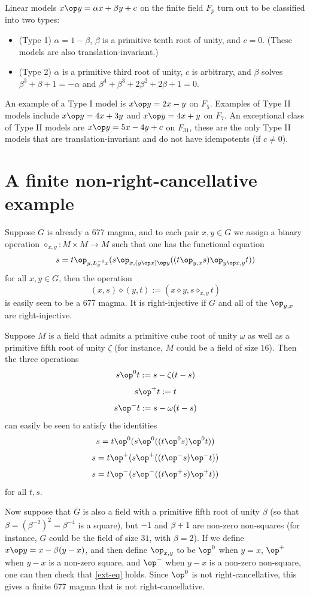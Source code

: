 Linear models $x \op y = \alpha x + \beta y + c$ on the finite field $F_p$ turn out to be classified into two types:
\begin{itemize}
\item (Type 1) $\alpha=1-\beta$, $\beta$ is a primitive tenth root of unity, and $c=0$.  (These models are also translation-invariant.)
\item (Type 2) $\alpha$ is a primitive third root of unity, $c$ is arbitrary, and $\beta$ solves $\beta^3+\beta+1=-\alpha$ and $\beta^4+\beta^3+2\beta^2+2\beta+1=0$.
\end{itemize}
An example of a Type I model is $x \op y = 2x-y$ on $F_5$.  Examples of Type II models include $x \op y = 4x+3y$ and $x \op y = 4x+y$ on $F_7$.  An exceptional class of Type II models are $x \op y = 5x-4y+c$ on $F_{31}$, these are the only Type II models that are translation-invariant and do not have idempotents (if $c \neq 0$).

\section{A finite non-right-cancellative example}

Suppose $G$ is already a 677 magma, and to each pair $x,y \in G$ we assign a binary operation $\diamond_{x,y}: M \times M \to M$ such that one has the functional equation
\begin{equation}\label{ext-eq}
  s = t \op_{y,L_y^{-1} x} (s \op_{x, (y \op x) \op y} ((t \op_{y,x} s) \op_{y \op x, y} t))
\end{equation}
for all $x,y \in G$, then the operation
$$ (x,s) \diamond (y,t) := (x \diamond y, s \diamond_{x,y} t)$$
is easily seen to be a 677 magma.  It is right-injective if $G$ and all of the $\op_{y,x}$ are right-injective.

Suppose $M$ is a field that admits a primitive cube root of unity $\omega$ as well as a primitive fifth root of unity $\zeta$ (for instance, $M$ could be a field of size $16$).  Then the three operations
$$ s \op^0 t := s - \zeta(t-s)$$
$$ s \op^+ t := t$$
$$ s \op^- t := s - \omega(t-s)$$
can easily be seen to satisfy the identities
$$s = t \op^0 (s \op^0 ((t \op^0 s) \op^0 t))$$
$$s = t \op^+ (s \op^+ ((t \op^- s) \op^- t))$$
$$s = t \op^- (s \op^- ((t \op^+ s) \op^+ t))$$
for all $t,s$.

Now suppose that $G$ is also a field with a primitive fifth root of unity $\beta$ (so that $\beta = \left(\beta^{-2}\right)^2 = \beta^{-4}$ is a square), but $-1$ and $\beta+1$ are non-zero non-squares (for instance, $G$ could be the field of size $31$, with $\beta=2$).  If we define $x \op y = x - \beta(y-x)$, and then define $\op_{x,y}$ to be $\op^0$ when $y=x$, $\op^+$ when $y-x$ is a non-zero square, and $\op^-$ when $y-x$ is a non-zero non-square, one can then check that \eqref{ext-eq} holds. Since $\op^0$ is not right-cancellative, this gives a finite 677 magma that is not right-cancellative.


